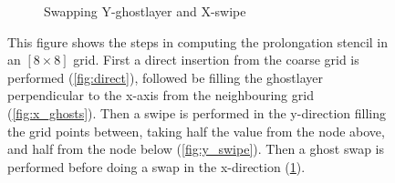\begin{figure}
\begin{subfigure}[b]{0.45\textwidth}
\begin{tikzpicture}[scale=0.5, auto,swap]
		\end{tikzpicture}
		\caption{Swapping Y-ghostlayer and X-swipe}
		\label{fig:x_swipe}
		\end{subfigure}
		\caption{This figure shows the steps in computing the prolongation stencil in an \([8\times8]\)
 				grid. First a direct insertion from the coarse grid is performed (\ref{fig:direct}),
				followed be filling the ghostlayer perpendicular to the x-axis from the neighbouring grid (\ref{fig:x_ghosts}).
				Then a swipe is performed in the y-direction filling the grid points between, taking half the value
				from the node above, and half from the node below (\ref{fig:y_swipe}). Then a ghost swap is performed before doing a swap in the x-direction (\ref{fig:x_swipe}).}
		\label{fig:prolongation}
	\end{figure}
